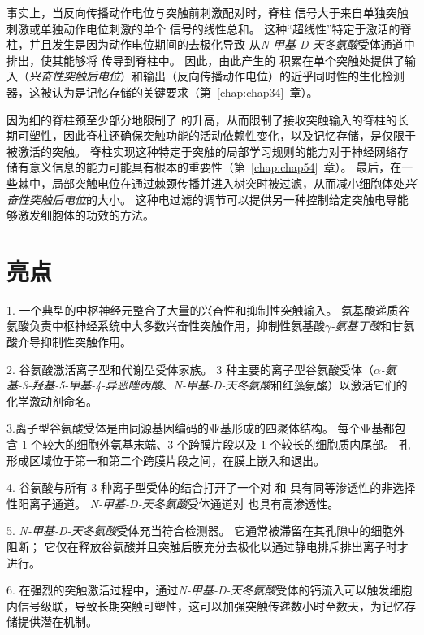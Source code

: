 事实上，当反向传播动作电位与突触前刺激配对时，脊柱  信号大于来自单独突触刺激或单独动作电位刺激的单个  信号的线性总和。
这种“超线性”特定于激活的脊柱，并且发生是因为动作电位期间的去极化导致  从\textit{N-甲基-D-天冬氨酸}受体通道中排出，使其能够将  传导到脊柱中。
因此，由此产生的  积累在单个突触处提供了输入（\textit{兴奋性突触后电位}）和输出（反向传播动作电位）的近乎同时性的生化检测器，这被认为是记忆存储的关键要求（第~\ref{chap:chap34}~章）。


因为细的脊柱颈至少部分地限制了  的升高，从而限制了接收突触输入的脊柱的长期可塑性，因此脊柱还确保突触功能的活动依赖性变化，以及记忆存储，是仅限于被激活的突触。
脊柱实现这种特定于突触的局部学习规则的能力对于神经网络存储有意义信息的能力可能具有根本的重要性（第~\ref{chap:chap54}~章）。
最后，在一些棘中，局部突触电位在通过棘颈传播并进入树突时被过滤，从而减小细胞体处\textit{兴奋性突触后电位}的大小。
这种电过滤的调节可以提供另一种控制给定突触电导能够激发细胞体的功效的方法。



\section{亮点}

1. 一个典型的中枢神经元整合了大量的兴奋性和抑制性突触输入。
氨基酸递质谷氨酸负责中枢神经系统中大多数兴奋性突触作用，抑制性氨基酸\textit{$\gamma$-氨基丁酸}和甘氨酸介导抑制性突触作用。


2. 谷氨酸激活离子型和代谢型受体家族。
3 种主要的离子型谷氨酸受体（\textit{$\alpha$-氨基-3-羟基-5-甲基-4-异恶唑丙酸}、\textit{N-甲基-D-天冬氨酸}和红藻氨酸）以激活它们的化学激动剂命名。


3.离子型谷氨酸受体是由同源基因编码的亚基形成的四聚体结构。 
每个亚基都包含 1 个较大的细胞外氨基末端、3 个跨膜片段以及 1 个较长的细胞质内尾部。
孔形成区域位于第一和第二个跨膜片段之间，在膜上嵌入和退出。


4. 谷氨酸与所有 3 种离子型受体的结合打开了一个对  和  具有同等渗透性的非选择性阳离子通道。
\textit{N-甲基-D-天冬氨酸}受体通道对  也具有高渗透性。


5. \textit{N-甲基-D-天冬氨酸}受体充当符合检测器。
它通常被滞留在其孔隙中的细胞外  阻断；
它仅在释放谷氨酸并且突触后膜充分去极化以通过静电排斥排出离子时才进行。 


6. 在强烈的突触激活过程中，通过\textit{N-甲基-D-天冬氨酸}受体的钙流入可以触发细胞内信号级联，导致长期突触可塑性，这可以加强突触传递数小时至数天，为记忆存储提供潜在机制。 


